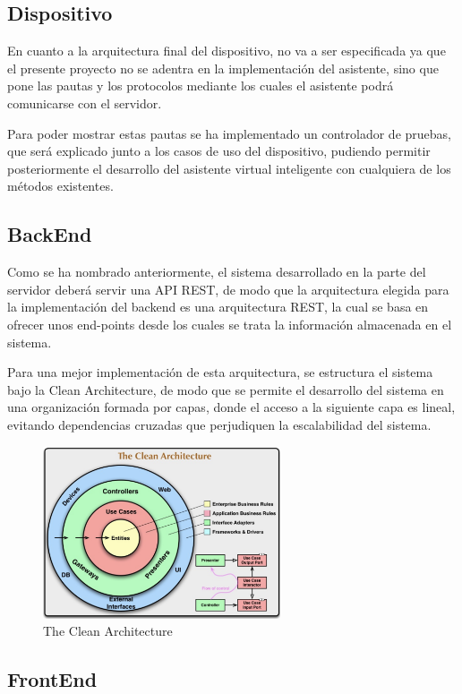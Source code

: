 \subsection{Dispositivo}

En cuanto a la arquitectura final del dispositivo, no va a ser especificada ya que el presente proyecto no se adentra en la implementación del asistente, sino que pone las pautas y los protocolos mediante los cuales el asistente podrá comunicarse con el servidor.

Para poder mostrar estas pautas se ha implementado un controlador de pruebas, que será explicado junto a los casos de uso del dispositivo, pudiendo permitir posteriormente el desarrollo del asistente virtual inteligente con cualquiera de los métodos existentes.

\subsection{BackEnd}

Como se ha nombrado anteriormente, el sistema desarrollado en la parte del servidor deberá servir una API REST, de modo que la arquitectura elegida para la implementación del backend es una arquitectura REST, la cual se basa en ofrecer unos end-points desde los cuales se trata la información almacenada en el sistema.

Para una mejor implementación de esta arquitectura, se estructura el sistema bajo la Clean Architecture, de modo que se permite el desarrollo del sistema en una organización formada por capas, donde el acceso a la siguiente capa es lineal, evitando dependencias cruzadas que perjudiquen la escalabilidad del sistema.

\begin{figure}[h!]
    \centering
    \includegraphics[width=7cm]{./img/arch/cleanarch.png}
    \caption{The Clean Architecture}
    \label{fig:cleanarch}
\end{figure}

\subsection{FrontEnd}

